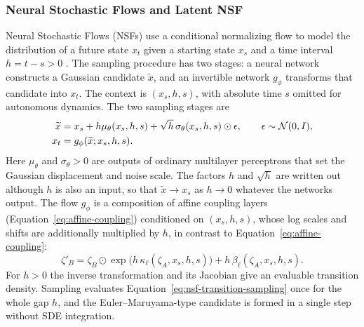 \subsubsection{Neural Stochastic Flows and Latent NSF}\label{sec:related-latent-nsf}
Neural Stochastic Flows (NSFs) use a conditional normalizing flow to model the distribution of a future state $x_t$ given a starting state $x_s$ and a time interval $h=t-s>0$ \citep{kiyohara2025nsf}. The sampling procedure has two stages: a neural network constructs a Gaussian candidate $\widetilde x$, and an invertible network $g_\phi$ transforms that candidate into $x_t$. The context is $(x_s,h,s)$, with absolute time $s$ omitted for autonomous dynamics. The two sampling stages are
\begin{equation}\label{eq:nsf-transition-sampling}
\begin{aligned}
 \widetilde x&=x_s+h\mu_\theta(x_s,h,s)+\sqrt h\,\sigma_\theta(x_s,h,s)\odot\epsilon,
 \qquad \epsilon\sim\mathcal N(0,I),\\
 x_t&=g_\phi(\widetilde x;x_s,h,s).
\end{aligned}
\end{equation}
Here $\mu_\theta$ and $\sigma_\theta>0$ are outputs of ordinary multilayer perceptrons that set the Gaussian displacement and noise scale. The factors $h$ and $\sqrt h$ are written out although $h$ is also an input, so that $\widetilde x\to x_s$ as $h\to0$ whatever the networks output. The flow $g_\phi$ is a composition of affine coupling layers (Equation~\eqref{eq:affine-coupling}) conditioned on $(x_s,h,s)$, whose log scales and shifts are additionally multiplied by $h$, in contrast to Equation~\eqref{eq:affine-coupling}:
\begin{equation}\label{eq:nsf-affine-coupling}
 \zeta'_B=\zeta_B\odot\exp\bigl(h\,\kappa_\ell(\zeta_A,x_s,h,s)\bigr)+h\,\beta_\ell(\zeta_A,x_s,h,s).
\end{equation}
For $h>0$ the inverse transformation and its Jacobian give an evaluable transition density. Sampling evaluates Equation~\eqref{eq:nsf-transition-sampling} once for the whole gap $h$, and the Euler--Maruyama-type candidate is formed in a single step without SDE integration.

